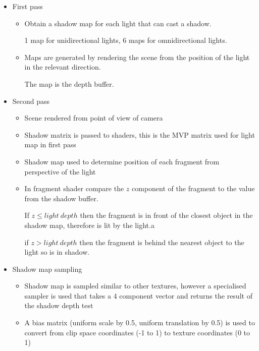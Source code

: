 \documentclass[a4paper]{article}
\begin{document}
\begin{itemize}
  \item
    First pass

    \begin{itemize}
      \item
        Obtain a shadow map for each light that can cast a shadow.

        1 map for unidirectional lights, 6 maps for omnidirectional lights.

      \item
        Maps are generated by rendering the scene from the position of the light
        in the relevant direction.

        The map is the depth buffer.

      \end{itemize}

    \item
      Second pass

      \begin{itemize}
        \item
          Scene rendered from point of view of camera

        \item
          Shadow matrix is passed to shaders, this is the MVP matrix used for
          light map in first pass

        \item
          Shadow map used to determine position of each fragment from
          perspective of the light

        \item
          In fragment shader compare the $z$ component of the fragment to the
          value from the shadow buffer.

          If $z \leq light \: depth$ then the fragment is in front of the
          closest object in the shadow map, therefore is lit by the light.a

          if $z > light \: depth$ then the fragment is behind the nearest object
          to the light so is in shadow.

      \end{itemize}

    \item
      Shadow map sampling

      \begin{itemize}
        \item
          Shadow map is sampled similar to other textures, however a specialised
          sampler is used that takes a 4 component vector and returns the result
          of the shadow depth test

        \item
          A bias matrix (uniform scale by 0.5, uniform translation by 0.5) is
          used to convert from clip space coordinates (-1 to 1) to texture
          coordinates (0 to 1)

      \end{itemize}

\end{itemize}
\end{document}
